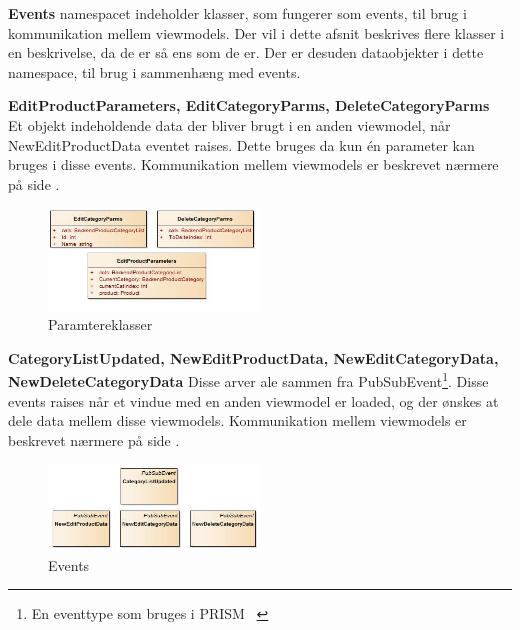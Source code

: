 \textbf{Events} namespacet indeholder klasser, som fungerer som events, til brug i kommunikation mellem viewmodels. Der vil i dette afsnit beskrives flere klasser i en beskrivelse, da de er så ens som de er. Der er desuden dataobjekter i dette namespace, til brug i sammenhæng med events.\\
\bigskip

\textbf{EditProductParameters, EditCategoryParms, DeleteCategoryParms}\\
Et objekt indeholdende data der bliver brugt i en anden viewmodel, når NewEditProductData eventet raises. Dette bruges da kun én parameter kan bruges i disse events. Kommunikation mellem viewmodels er beskrevet nærmere på side \pageref{viewcomm}. \bigskip
\begin{center}
\begin{figure}[!h]
    \centering
    \includegraphics[width=0.50\textwidth]{Systemdesign/backend/klassebeskrivelser/Images/Parms.png}
    \caption{Paramtereklasser}
    \label{fig:EditProductParameters}
\end{figure}
\end{center}
\label{EditProductParameters_Beskrivelse}
 \bigskip 




\textbf{CategoryListUpdated, NewEditProductData, NewEditCategoryData, NewDeleteCategoryData}
Disse arver ale sammen fra PubSubEvent\footnote{En eventtype som bruges i PRISM ~\cite{PRISM}}. Disse events raises når et vindue med en anden viewmodel er loaded, og der ønskes at dele data mellem disse viewmodels. Kommunikation mellem viewmodels er beskrevet nærmere på side \pageref{viewcomm}.  \bigskip
\begin{center}
\begin{figure}[!h]
    \centering
    \includegraphics[width=0.50\textwidth]{Systemdesign/backend/klassebeskrivelser/Images/Events1.png}
    \caption{Events}
    \label{fig:CategoryListUpdated}
\end{figure}
\end{center}
\label{CategoryListUpdated_Beskrivelse}
 \bigskip 



